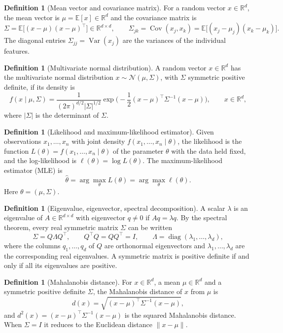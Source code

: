 \documentclass[11pt]{article}
\theoremstyle{definition}
\newtheorem{definition}[theorem]{Definition}
\newcommand{\R}{\mathbb{R}}
\newcommand{\T}{^{\top}}
\newcommand{\E}{\mathbb{E}}
\newcommand{\Cov}{\operatorname{Cov}}
\newcommand{\Var}{\operatorname{Var}}
\newcommand{\diag}{\operatorname{diag}}
\begin{document}
\begin{definition}[Mean vector and covariance matrix]\label{def:cov}
For a random vector $x\in\R^d$, the mean vector is $\mu=\E[x]\in\R^d$ and the covariance matrix is
\[
\Sigma=\E\big[(x-\mu)(x-\mu)\T\big]\in\R^{d\times d},\qquad \Sigma_{jk}=\Cov(x_j,x_k)=\E\big[(x_j-\mu_j)(x_k-\mu_k)\big].
\]
The diagonal entries $\Sigma_{jj}=\Var(x_j)$ are the variances of the individual features.
\end{definition}

\begin{definition}[Multivariate normal distribution]\label{def:mvn}
A random vector $x\in\R^d$ has the multivariate normal distribution $x\sim\mathcal N(\mu,\Sigma)$, with $\Sigma$ symmetric positive definite, if its density is
\[
f(x\mid\mu,\Sigma)=\frac{1}{(2\pi)^{d/2}|\Sigma|^{1/2}}\exp\!\Big(-\frac12(x-\mu)\T\Sigma^{-1}(x-\mu)\Big),\qquad x\in\R^d,
\]
where $|\Sigma|$ is the determinant of $\Sigma$.
\end{definition}

\begin{definition}[Likelihood and maximum-likelihood estimator]\label{def:mle}
Given observations $x_1,\dots,x_n$ with joint density $f(x_1,\dots,x_n\mid\theta)$, the likelihood is the function $L(\theta)=f(x_1,\dots,x_n\mid\theta)$ of the parameter $\theta$ with the data held fixed, and the log-likelihood is $\ell(\theta)=\log L(\theta)$. The maximum-likelihood estimator (MLE) is
\[
\hat\theta=\arg\max_\theta L(\theta)=\arg\max_\theta \ell(\theta).
\]
Here $\theta=(\mu,\Sigma)$.
\end{definition}

\begin{definition}[Eigenvalue, eigenvector, spectral decomposition]\label{def:eig}
A scalar $\lambda$ is an eigenvalue of $A\in\R^{d\times d}$ with eigenvector $q\neq0$ if $Aq=\lambda q$. By the spectral theorem, every real symmetric matrix $\Sigma$ can be written
\[
\Sigma=Q\Lambda Q\T,\qquad Q\T Q=QQ\T=I,\qquad \Lambda=\diag(\lambda_1,\dots,\lambda_d),
\]
where the columns $q_1,\dots,q_d$ of $Q$ are orthonormal eigenvectors and $\lambda_1,\dots,\lambda_d$ are the corresponding real eigenvalues. A symmetric matrix is positive definite if and only if all its eigenvalues are positive.
\end{definition}

\begin{definition}[Mahalanobis distance]\label{def:mahal}
For $x\in\R^d$, a mean $\mu\in\R^d$ and a symmetric positive definite $\Sigma$, the Mahalanobis distance of $x$ from $\mu$ is
\[
d(x)=\sqrt{(x-\mu)\T\Sigma^{-1}(x-\mu)},
\]
and $d^2(x)=(x-\mu)\T\Sigma^{-1}(x-\mu)$ is the squared Mahalanobis distance. When $\Sigma=I$ it reduces to the Euclidean distance $\|x-\mu\|$.
\end{definition}
\end{document}
